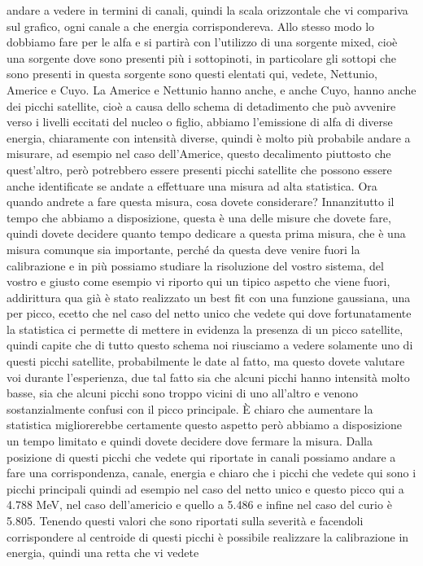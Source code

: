 andare a vedere in termini di canali, quindi la scala orizzontale che vi compariva sul grafico, ogni canale a che energia corrispondereva. Allo stesso modo lo dobbiamo fare per le alfa e si partirà con l'utilizzo di una sorgente mixed, cioè una sorgente dove sono presenti più i sottopinoti, in particolare gli sottopi che sono presenti in questa sorgente sono questi elentati qui, vedete, Nettunio, Americe e Cuyo. La Americe e Nettunio hanno anche, e anche Cuyo, hanno anche dei picchi satellite, cioè a causa dello schema di detadimento che può avvenire verso i livelli eccitati del nucleo o figlio, abbiamo l'emissione di alfa di diverse energia, chiaramente con intensità diverse, quindi è molto più probabile andare a misurare, ad esempio nel caso dell'Americe, questo decalimento piuttosto che quest'altro, però potrebbero essere presenti picchi satellite che possono essere anche identificate se andate a effettuare una misura ad alta statistica. Ora quando andrete a fare questa misura, cosa dovete considerare? Innanzitutto il tempo che abbiamo a disposizione, questa è una delle misure che dovete fare, quindi dovete decidere quanto tempo dedicare a questa prima misura, che è una misura comunque sia importante, perché da questa deve venire fuori la calibrazione e in più possiamo studiare la risoluzione del vostro sistema, del vostro e giusto come esempio vi riporto qui un tipico aspetto che viene fuori, addirittura qua già è stato realizzato un best fit con una funzione gaussiana, una per picco, ecetto che nel caso del netto unico che vedete qui dove fortunatamente la statistica ci permette di mettere in evidenza la presenza di un picco satellite, quindi capite che di tutto questo schema noi riusciamo a vedere solamente uno di questi picchi satellite, probabilmente le date al fatto, ma questo dovete valutare voi durante l'esperienza, due tal fatto sia che alcuni picchi hanno intensità molto basse, sia che alcuni picchi sono troppo vicini di uno all'altro e venono sostanzialmente confusi con il picco principale. È chiaro che aumentare la statistica migliorerebbe certamente questo aspetto però abbiamo a disposizione un tempo limitato e quindi dovete decidere dove fermare la misura. Dalla posizione di questi picchi che vedete qui riportate in canali possiamo andare a fare una corrispondenza, canale, energia e chiaro che i picchi che vedete qui sono i picchi principali quindi ad esempio nel caso del netto unico e questo picco qui a 4.788 MeV, nel caso dell'americio e quello a 5.486 e infine nel caso del curio è 5.805. Tenendo questi valori che sono riportati sulla severità e facendoli corrispondere al centroide di questi picchi è possibile realizzare la calibrazione in energia, quindi una retta che vi vedete 

